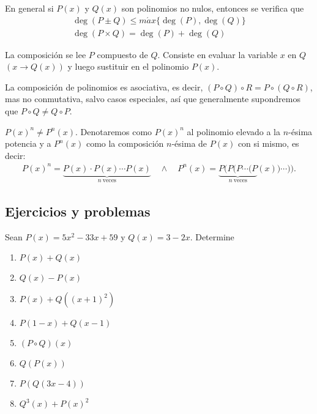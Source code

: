 \begin{remark.tcb}
    En general si $P(x)$ y $Q(x)$ son polinomios no nulos, entonces se verifica que
    \begin{gather*}
        \deg{(P\pm Q)} \leq m\acute ax\{\deg{(P)}, \deg{(Q)}\}\\
        \deg{(P\times Q)} = \deg{(P)} + \deg{(Q)}
    \end{gather*}
\end{remark.tcb}

\begin{remark.tcb}
    La composición se lee $P$ compuesto de $Q$.
    Consiste en evaluar la variable $x$ en $Q$ $(x \to Q(x))$ y luego sustituir en el polinomio $P(x)$.
\end{remark.tcb}

La composición de polinomios es asociativa, es decir, $(P \circ Q) \circ R = P \circ (Q \circ R)$, mas no conmutativa, salvo casos especiales, así que generalmente supondremos que $P \circ Q \neq  Q \circ P$.

\begin{remark.tcb}
    $P(x)^n \neq P^n(x)$.
    Denotaremos como $P(x)^n$ al polinomio elevado a la $n$-ésima potencia y a $P^n(x)$ como la composición $n$-ésima de $P(x)$ con si mismo, es decir:
    \begin{gather*}
        P(x)^n = \underbrace{P(x) \cdot P(x) \cdots P(x)}_{n\ \text{veces}} \quad \land \quad
        P^n (x) = \underbrace{P(P(P\cdots(P}_{n\ \text{veces}}(x))\cdots)).
    \end{gather*}
\end{remark.tcb}



\subsection{Ejercicios y problemas}

\begin{section-exercise}
    Sean $P(x) = 5x^2 - 33x + 59$ y $Q(x) = 3 - 2x$.
    Determine
    \begin{multicols}{2}
        \begin{enumerate}
            \item $P(x) + Q(x)$
            \item $Q(x) - P(x)$
            \item $P(x) + Q((x+1)^2)$
            \item $P(1-x) + Q(x-1)$
            \item $(P\circ Q)(x)$
            \item $Q(P(x))$
            \item $P(Q(3x - 4))$
            \item $Q^3(x) + P(x)^2$
        \end{enumerate}
    \end{multicols}
\end{section-exercise}

